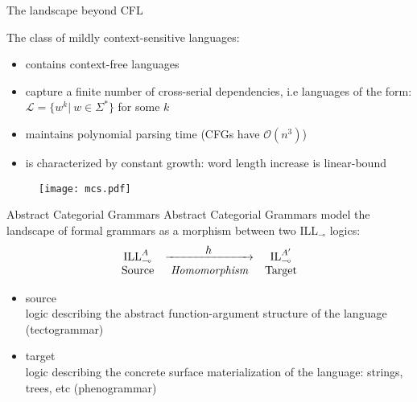 \documentclass{beamer}
\begin{document}
\begin{frame}{The landscape beyond CFL}
	\small 

	\begin{minipage}{0.65\textwidth}
	The class of \alert{mildly context-sensitive languages}:
	\begin{itemize}
		\item contains context-free languages
		\item capture a finite number of cross-serial dependencies, i.e languages of the form: $\mathcal{L} = \{w^k | \ w \in \Sigma^*\}$ for some $k$
		\item maintains polynomial parsing time (CFGs have $\mathcal{O}(n^3)$)
		\item is characterized by constant growth: word length increase is linear-bound
	\end{itemize}	
	\end{minipage}%
	\begin{minipage}{0.35\textwidth}
	\begin{figure}
	\texttt{[image: mcs.pdf]}	
	\end{figure}
	\end{minipage}
	\vfill
	
\end{frame}

\begin{frame}{Abstract Categorial Grammars}
	\small
	\alert{Abstract Categorial Grammars} model the landscape of formal grammars as a morphism between two ILL${}_\multimap$ logics:
	\[
		\begin{array}{@{}c@{\quad}c@{\quad}c@{}}
			\text{ILL}_\multimap^A & \xrightarrow{\makebox[1in]{$h$}} & \text{IL}_\multimap^{A^\prime}\\
			\text{Source} & \textit{Homomorphism} & \text{Target}
		\end{array}
	\]
	\begin{itemize}
		\item source\\
		logic describing the abstract function-argument structure of the language (tectogrammar)
		\item target\\
		logic describing the concrete surface materialization of the language: strings, trees, etc (phenogrammar)
	\end{itemize}
\end{frame}
\end{document}
